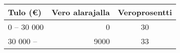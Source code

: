 \centering
	\begin{tabular}{|lrc|}
        \hline
        Tulo (\euro)   & Vero alarajalla  & Veroprosentti \\
        \hline
        0 -- 30 000 & 0 &  30            \\
        30 000 --   & 9000 & 33   \\
        \hline
	\end{tabular}